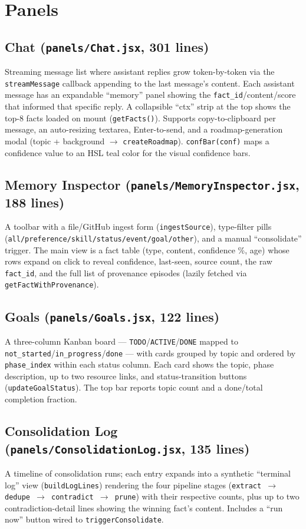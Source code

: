 \documentclass[11pt,a4paper]{report}
\newcommand{\code}[1]{\texttt{\small #1}}
\newcommand{\file}[1]{\texttt{\small\color{accent!70!black}#1}}
\begin{document}
\section{Panels}

\subsection{Chat (\file{panels/Chat.jsx}, 301 lines)}
Streaming message list where assistant replies grow token-by-token via the \code{streamMessage} callback appending to the last message's content. Each assistant message has an expandable ``memory'' panel showing the \code{fact\_id}/content/score that informed that specific reply. A collapsible ``ctx'' strip at the top shows the top-8 facts loaded on mount (\code{getFacts()}). Supports copy-to-clipboard per message, an auto-resizing textarea, Enter-to-send, and a roadmap-generation modal (topic + background $\to$ \code{createRoadmap}). \code{confBar(conf)} maps a confidence value to an HSL teal color for the visual confidence bars.

\subsection{Memory Inspector (\file{panels/MemoryInspector.jsx}, 188 lines)}
A toolbar with a file/GitHub ingest form (\code{ingestSource}), type-filter pills (\code{all/preference/skill/status/event/goal/other}), and a manual ``consolidate'' trigger. The main view is a fact table (type, content, confidence \%, age) whose rows expand on click to reveal confidence, last-seen, source count, the raw \code{fact\_id}, and the full list of provenance episodes (lazily fetched via \code{getFactWithProvenance}).

\subsection{Goals (\file{panels/Goals.jsx}, 122 lines)}
A three-column Kanban board — \code{TODO}/\code{ACTIVE}/\code{DONE} mapped to \code{not\_started}/\code{in\_progress}/\code{done} — with cards grouped by topic and ordered by \code{phase\_index} within each status column. Each card shows the topic, phase description, up to two resource links, and status-transition buttons (\code{updateGoalStatus}). The top bar reports topic count and a done/total completion fraction.

\subsection{Consolidation Log (\file{panels/ConsolidationLog.jsx}, 135 lines)}
A timeline of consolidation runs; each entry expands into a synthetic ``terminal log'' view (\code{buildLogLines}) rendering the four pipeline stages (\code{extract $\to$ dedupe $\to$ contradict $\to$ prune}) with their respective counts, plus up to two contradiction-detail lines showing the winning fact's content. Includes a ``run now'' button wired to \code{triggerConsolidate}.
\end{document}
